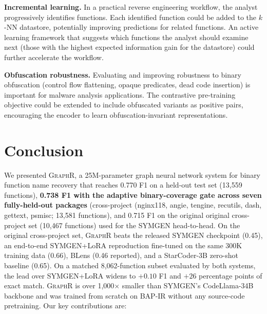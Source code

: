 \documentclass[sigconf,nonacm]{acmart}
\newcommand{\sysname}{\textsc{GraphR}}
\begin{document}
\textbf{Incremental learning.} In a practical reverse engineering workflow, the analyst progressively identifies functions. Each identified function could be added to the $k$-NN datastore, potentially improving predictions for related functions. An active learning framework that suggests which functions the analyst should examine next (those with the highest expected information gain for the datastore) could further accelerate the workflow.

\textbf{Obfuscation robustness.} Evaluating and improving robustness to binary obfuscation (control flow flattening, opaque predicates, dead code insertion) is important for malware analysis applications. The contrastive pre-training objective could be extended to include obfuscated variants as positive pairs, encouraging the encoder to learn obfuscation-invariant representations.

\section{Conclusion}
\label{sec:conclusion}

We presented \sysname{}, a 25M-parameter graph neural network system for binary function name recovery that reaches 0.770 F1 on a held-out test set (13{,}559 functions), \textbf{0.738 F1 with the adaptive binary-coverage gate across seven fully-held-out packages} (cross-project (nginx118, angie, tengine, recutils, dash, gettext, psmisc; 13{,}581 functions), and 0.715 F1 on the original original cross-project set (10{,}467 functions) used for the SYMGEN head-to-head. On the original cross-project set, \sysname{} beats the released SYMGEN checkpoint (0.45), an end-to-end SYMGEN+LoRA reproduction fine-tuned on the same 300K training data (0.66), BLens (0.46 reported), and a StarCoder-3B zero-shot baseline (0.65). On a matched 8{,}062-function subset evaluated by both systems, the lead over SYMGEN+LoRA widens to $+0.10$ F1 and $+26$ percentage points of exact match. \sysname{} is over 1{,}000$\times$ smaller than SYMGEN's CodeLlama-34B backbone and was trained from scratch on BAP-IR without any source-code pretraining. Our key contributions are:
\end{document}
